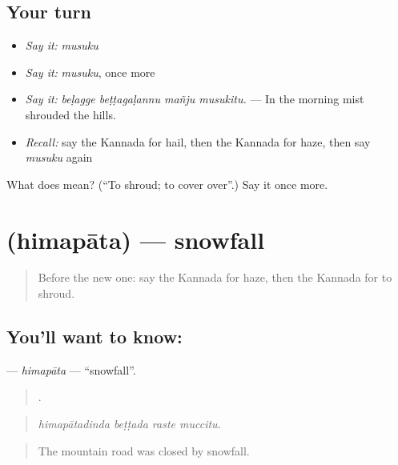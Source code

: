 \subsection*{Your turn}
\begin{itemize}
\raggedright
  \item \emph{Say it:} \emph{musuku}
  \item \emph{Say it:} \emph{musuku}, once more
  \item \emph{Say it:} \emph{beḷagge beṭṭagaḷannu mañju musukitu.} — In the morning mist shrouded the hills.
  \item \emph{Recall:} say the Kannada for hail, then the Kannada for haze, then say \emph{musuku} again
\end{itemize}

\begin{tcolorbox}[breakable,colback=teal!4,colframe=teal!35!black,title={Before you move on}]
What does  mean? (\textquotedblleft{}To shroud; to cover over\textquotedblright{}.) Say it once more.
\end{tcolorbox}
\section[\texorpdfstring{\kn{ಹಿಮಪಾತ} (himapāta)}{ಹಿಮಪಾತ (himapāta)}]{ (himapāta) — snowfall}

\label{lesson:KA-C486-himapata}



\begin{quote}
Before the new one: say the Kannada for haze, then the Kannada for to shroud.
\end{quote}

\subsection*{You'll want to know: }
\textbf{} — \emph{himapāta} — \textquotedblleft{}snowfall\textquotedblright{}.

\begin{quote}
   .
\end{quote}

\begin{quote}
\emph{himapātadinda beṭṭada raste muccitu.}
\end{quote}

\begin{quote}
The mountain road was closed by snowfall.
\end{quote}

